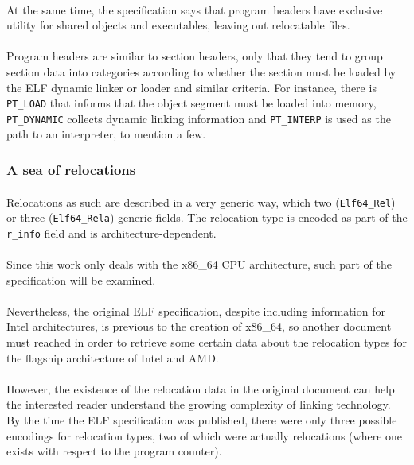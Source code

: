 \documentclass[12pt]{article}
\begin{document}
	\paragraph{}At the same time, the specification says that program headers have exclusive utility for shared objects and executables, leaving out relocatable files.
	\paragraph{}Program headers are similar to section headers, only that they tend to group section data into categories according to whether the section must be loaded by the ELF dynamic linker or loader and similar criteria. For instance, there is \verb|PT_LOAD| that informs that the object segment must be loaded into memory, \verb|PT_DYNAMIC| collects dynamic linking information and \verb|PT_INTERP| is used as the path to an interpreter, to mention a few.
	
	\subsubsection{A sea of relocations}
	\paragraph{}Relocations as such are described in a very generic way, which two (\verb|Elf64_Rel|) or three (\verb|Elf64_Rela|) generic fields. The relocation type is encoded as part of the \verb|r_info| field and is architecture-dependent.
	\paragraph{}Since this work only deals with the x86\_64 CPU architecture, such part of the specification will be examined.
	\paragraph{}Nevertheless, the original ELF specification, despite including information for Intel architectures, is previous to the creation of x86\_64, so another document must reached in order to retrieve some certain data about the relocation types for the flagship architecture of Intel and AMD.
	\paragraph{}However, the existence of the relocation data in the original document can help the interested reader understand the growing complexity of linking technology. By the time the ELF specification was published, there were only three possible encodings for relocation types, two of which were actually relocations (where one exists with respect to the program counter).
	
\end{document}

